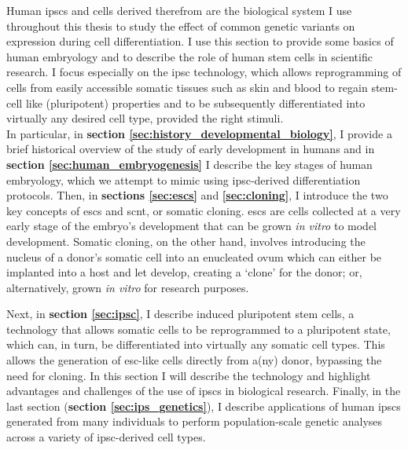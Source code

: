 Human \glspl{ipsc} and cells derived therefrom are the biological system I use throughout this thesis to study the effect of common genetic variants on expression during cell differentiation.
I use this section to provide some basics of human embryology and to describe the role of human stem cells in scientific research.
I focus especially on the \gls{ipsc} technology, which allows reprogramming of cells from easily accessible somatic tissues such as skin and blood to regain stem-cell like (pluripotent) properties and to be subsequently differentiated into virtually any desired cell type, provided the right stimuli.\\

In particular, in \textbf{section \ref{sec:history_developmental_biology}}, I provide a brief historical overview of the study of early development in humans and in \textbf{section \ref{sec:human_embryogenesis}} I describe the key stages of human embryology, which we attempt to mimic using \gls{ipsc}-derived differentiation protocols.
Then, in \textbf{sections \ref{sec:escs}} and \textbf{\ref{sec:cloning}}, I introduce the two key concepts of \glspl{esc} and \gls{scnt}, or somatic cloning.
\glspl{esc} are cells collected at a very early stage of the embryo's development that can be grown \textit{in vitro} to model development.
Somatic cloning, on the other hand, involves introducing the nucleus of a donor's somatic cell into an enucleated ovum which can either be implanted into a host and let develop, creating a `clone' for the donor; or, alternatively, grown \textit{in vitro} for research purposes.
 
Next, in \textbf{section \ref{sec:ipsc}}, I describe induced pluripotent stem cells, a technology that allows somatic cells to be reprogrammed to a pluripotent state, which can, in turn, be differentiated into virtually any
somatic cell types.
This allows the generation of \gls{esc}-like cells directly from a(ny) donor, bypassing the need for cloning. 
In this section I will describe the technology and highlight advantages and challenges of the use of \glspl{ipsc} in biological research.
Finally, in the last section (\textbf{section \ref{sec:ips_genetics}}), I describe 
applications of human \glspl{ipsc} generated from many individuals to perform population-scale genetic analyses across a variety of \gls{ipsc}-derived cell types.


